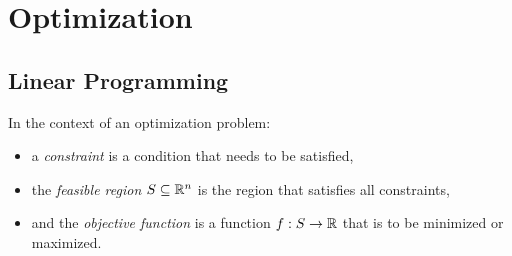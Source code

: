 
\chapter{Optimization}
\label{ch:optimization}

\section{Linear Programming}

\begin{defn}
    In the context of an optimization problem:
    \begin{itemize}
        \item a \emph{constraint} is a condition that needs to be satisfied,
        \item the \emph{feasible region} $S \subseteq \mathbb{R}^n$ is the region that satisfies all constraints,
        \item and the \emph{objective function} is a function $f: S \to \mathbb{R}$ that is to be minimized or maximized.
    \end{itemize}
\end{defn}

